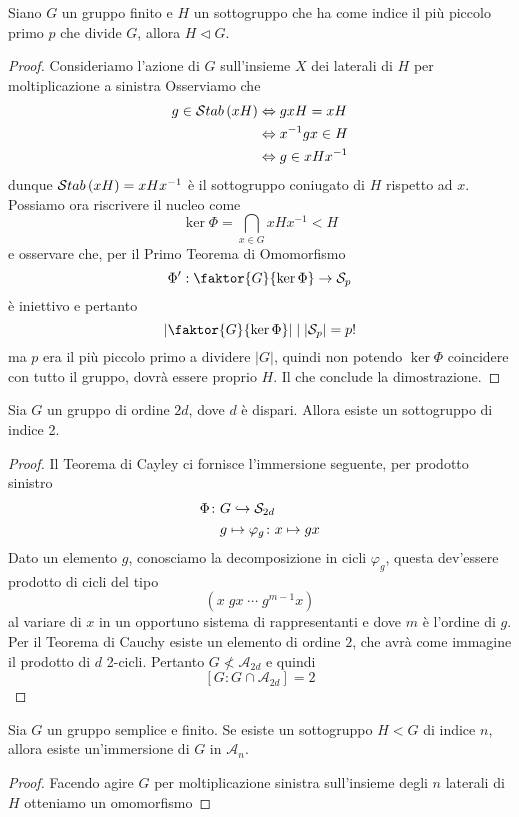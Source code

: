 \begin{multicols}{2}
	
	\begin{prop}\label{ppp}
		Siano $ G $ un gruppo finito e $ H $ un sottogruppo che ha come indice il più piccolo primo $ p $ che divide $ G $, allora $ H \lhd G $.
	\end{prop}
	\begin{proof}
		Consideriamo l'azione di $ G $ sull'insieme $ X $ dei laterali di $ H $ per moltiplicazione a sinistra 
		Osserviamo che 
		\begin{align*}
		g \in \Stab{xH} &\Leftrightarrow gxH = xH \\
		&\Leftrightarrow x^{-1}gx \in H \\
		&\Leftrightarrow g \in xHx^{-1} \\
		\end{align*}
		dunque $ \Stab{xH} = xHx^{-1} $ è il sottogruppo coniugato di $ H $ rispetto ad $ x $. Possiamo ora riscrivere il nucleo come
		\[ \ker\Phi = \bigcap_{x \in G} xHx^{-1} < H \]
		e osservare che, per il Primo Teorema di Omomorfismo
		\[ \Phi ' : \faktor{G}{\ker\Phi} \rightarrow \mathcal{S}_p \]
		è iniettivo e pertanto
		\[ \left| \faktor{G}{\ker\Phi} \right| \mid |\mathcal{S}_p| = p! \]
		ma $ p $ era il più piccolo primo a dividere $ |G| $, quindi non potendo $ \ker\Phi $ coincidere con tutto il gruppo, dovrà essere proprio $ H $. Il che conclude la dimostrazione.
	\end{proof}
	
	\begin{prop}
		Sia $ G $ un gruppo di ordine $ 2d $, dove $ d $ è dispari. Allora esiste un sottogruppo di indice 2.
	\end{prop}
	\begin{proof}
		Il Teorema di Cayley ci fornisce l'immersione seguente, per prodotto sinistro
		\begin{align*}
		\Phi \colon & G \hookrightarrow \S_{2d} \\
		& g \mapsto \varphi_g \colon x \mapsto gx
		\end{align*}
		Dato un elemento $ g $, conosciamo la decomposizione in cicli $ \varphi_g $, questa dev'essere prodotto di cicli del tipo
		$$  (x \; gx \; \cdots \; g^{m-1}x)  $$
		al variare di $ x $ in un opportuno sistema di rappresentanti e dove $ m $ è l'ordine di $ g $. Per il Teorema di Cauchy esiste un elemento di ordine $ 2 $, che avrà come immagine il prodotto di $ d $ 2-cicli. Pertanto $ G \nless \mathcal{A}_{2d} $ e quindi $$  [G : G \cap \mathcal{A}_{2d}] = 2  $$
	\end{proof}
	\columnbreak
	\begin{prop}
		Sia $ G $ un gruppo semplice e finito. Se esiste un sottogruppo $ H < G $ di indice $ n $, allora esiste un'immersione di $ G $ in $ \mathcal{A}_n $.
	\end{prop}
	\begin{proof}
		Facendo agire $ G $ per moltiplicazione sinistra sull'insieme degli $ n $ laterali di $ H $ otteniamo un omomorfismo
		

\end{proof}
\end{multicols}
